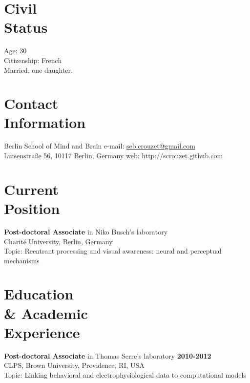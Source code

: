 \documentclass[margin,line]{resume}
\begin{document}
\begin{resume}

    \section{\mysidestyle Civil\\Status}
    Age: 30\\
    Citizenship: French\\
    Married, one daughter.
    \vspace{3mm}


    \section{\mysidestyle Contact\\Information}
    Berlin School of Mind and Brain             \hfill e-mail: \href{mailto:seb.crouzet@gmail.com}{seb.crouzet@gmail.com} \\
    Luisenstraße 56, 10117 Berlin, Germany      \hfill web: \url{http://scrouzet.github.com} 
    
    
    \vspace{3mm}
    \section{\mysidestyle Current\\Position}
    \textbf{Post-doctoral Associate} in Niko Busch’s laboratory\\
    Charité University, Berlin, Germany\\
    Topic: Reentrant processing and visual awareness: neural and perceptual mechanisms 


    \vspace{3mm}
    \section{\mysidestyle Education \\ \& Academic \\ Experience }
	
	\textbf{Post-doctoral Associate} in Thomas Serre’s laboratory \hfill \textbf{2010-2012}\\
	CLPS, Brown University, Providence, RI, USA\\
	Topic: Linking behavioral and electrophysiological data to computational models


\end{resume}
\end{document}
